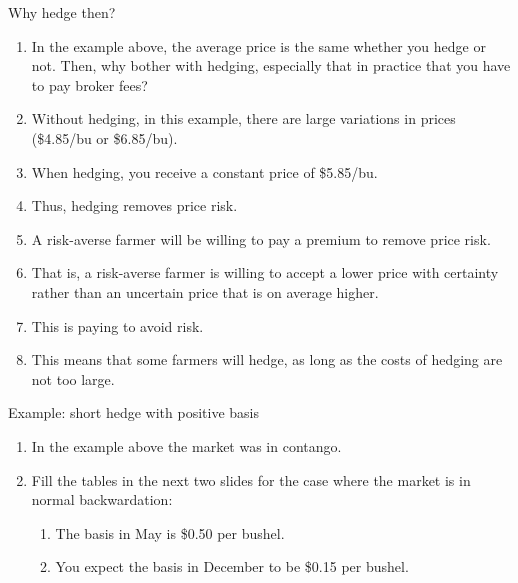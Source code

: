 \documentclass[table,xcolor=pdftex,dvipsnames]{beamer}\usepackage[]{graphicx}\usepackage[]{color}
\begin{document}
\begin{frame}{Why hedge then?}
\begin{enumerate}[label=\textbullet]
  \item In the example above, the average price is the same whether you hedge or not. Then, why bother with hedging, especially that in practice that you have to pay broker fees?
  \item Without hedging, in this example, there are large variations in prices (\$4.85/bu or \$6.85/bu).
  \item When hedging, you receive a constant price of \$5.85/bu.
  \item Thus, hedging removes price risk.
  \item A risk-averse farmer will be willing to pay a premium to remove price risk.
  \item That is, a risk-averse farmer is willing to accept a lower price with certainty rather than an uncertain price that is on average higher.
  \item This is paying to avoid risk.
  \item This means that some farmers will hedge, as long as the costs of hedging are not too large.
\end{enumerate}
\end{frame}



\begin{frame}{Example: short hedge with positive basis}
\begin{enumerate}[label=\textbullet]
  \item In the example above the market was in contango.
  \item Fill the tables in the next two slides for the case where the market is in normal backwardation:
      \begin{enumerate}[label=-]
            \item The basis in May is \$0.50 per bushel.
            \item You expect the basis in December to be \$0.15 per bushel.
      \end{enumerate}
\end{enumerate}
\end{frame}

\end{document}
